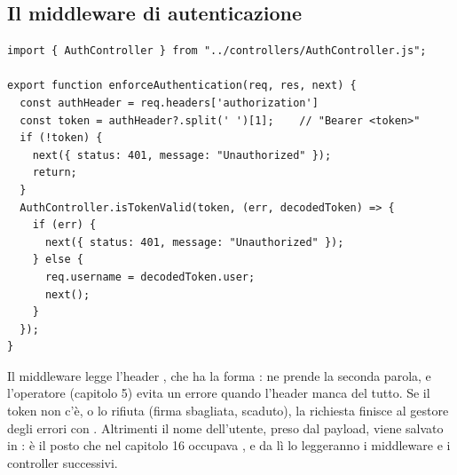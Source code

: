 \subsection{Il middleware di autenticazione}

\begin{affianco}[0.58][c]
\codicepiccolo
\begin{lstlisting}[style=js, name=middleware/authorization.js]
import { AuthController } from "../controllers/AuthController.js";

export function enforceAuthentication(req, res, next) {
  const authHeader = req.headers['authorization']
  const token = authHeader?.split(' ')[1];    // "Bearer <token>"
  if (!token) {
    next({ status: 401, message: "Unauthorized" });
    return;
  }
  AuthController.isTokenValid(token, (err, decodedToken) => {
    if (err) {
      next({ status: 401, message: "Unauthorized" });
    } else {
      req.username = decodedToken.user;
      next();
    }
  });
}
\end{lstlisting}
\risultato
\begin{immagine}
\end{immagine}
\end{affianco}

Il middleware legge l'header , che ha la forma
:  ne prende la seconda parola, e
l'operatore  (capitolo 5) evita un errore quando l'header manca del
tutto. Se il token non c'è, o  lo rifiuta (firma sbagliata,
scaduto), la richiesta finisce al gestore degli errori con .
Altrimenti il nome dell'utente, preso dal payload, viene salvato in
: è il posto che nel capitolo 16 occupava
, e da lì lo leggeranno i middleware e i controller
successivi.

